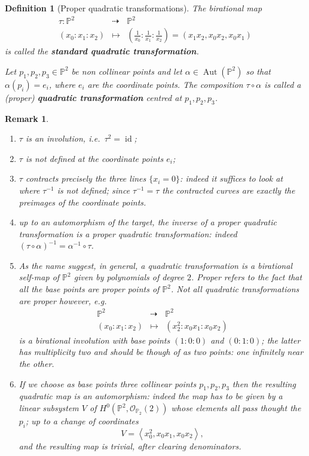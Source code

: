 \documentclass[a4paper,11pt]{amsart}
\newtheorem{remark}[theorem]{Remark}
\newtheorem{definition}[theorem]{Definition}
\def\id{\operatorname{id}}
\def\Aut{\operatorname{Aut}}
\newcommand{\OO}{\mathcal{O}}
\newcommand{\PP}{\mathbb{P}}
\newcommand{\rmap}{\dashrightarrow}
\begin{document}
\begin{definition}[{Proper quadratic transformations}]\label{def:properQuad}
	The birational map
	\[
	\begin{array}{ccc}
		\tau\colon \PP^2 & \rmap & \PP^2\\
		(x_0:x_1:x_2) & \mapsto & \left(\frac{1}{x_0}:\frac{1}{x_1}:\frac{1}{x_2}\right) = \left(x_1x_2,x_0x_2,x_0x_1\right)
	\end{array}
	\]
	is called the \textbf{standard quadratic transformation}.
	
	Let $p_1,p_2,p_3 \in \PP^2$ be non collinear points and let $\alpha \in \Aut(\PP^2)$ so that $\alpha(p_i) = e_i$, where $e_i$ are the coordinate points.
	The composition $\tau\circ \alpha$ is called a (proper) \textbf{quadratic transformation} centred at $p_1,p_2,p_3$.
\end{definition}


\begin{remark}\label{rem:quadraticTransformations}\leavevmode
	\begin{enumerate}
		\item $\tau$ is an involution, i.e.\ $\tau^2 = \id$;
		\item $\tau$ is not defined at the coordinate points $e_i$;
		\item $\tau$ contracts precisely the three lines $\{x_i = 0\}$:
		indeed it suffices to look at where $\tau^{-1}$ is not defined;
		since $\tau^{-1} = \tau$ the contracted curves are exactly the preimages of the coordinate points.
		\item up to an automorphism of the target, the inverse of a proper quadratic transformation is a proper quadratic transformation:
		indeed $(\tau \circ \alpha)^{-1} = \alpha^{-1}\circ \tau$.
		\item As the name suggest, in general, a \emph{quadratic} transformation is a birational self-map of $\PP^2$ given by polynomials of degree $2$.
		Proper refers to the fact that all the base points are proper points of $\PP^2$.
		Not all quadratic transformations are proper however, e.g.\
		\[
		\begin{array}{ccc}
			\PP^2 & \rmap &\PP^2 \\
			(x_0:x_1:x_2) & \mapsto & (x_2^2:x_0x_1:x_0x_2)
		\end{array}
		\]
		is a birational involution with base points $(1:0:0)$ and $(0:1:0)$;
		the latter has multiplicity two and should be though of as two points: one infinitely near the other.
		\item\label{it:quadraticTransformations6} If we choose as base points three collinear points $p_1,p_2,p_3$ then the resulting quadratic map is an automorphism:
		indeed the map has to be given by a linear subsystem $V$ of $H^0(\PP^2,\OO_{\PP_2}(2))$ whose elements all pass thought the $p_i$;
		up to a change of coordinates
		\[
		V = \left\langle x_0^2,x_0x_1,x_0x_2\right\rangle,
		\]
		and the resulting map is trivial, after clearing denominators.
	\end{enumerate}
\end{remark}
\end{document}
